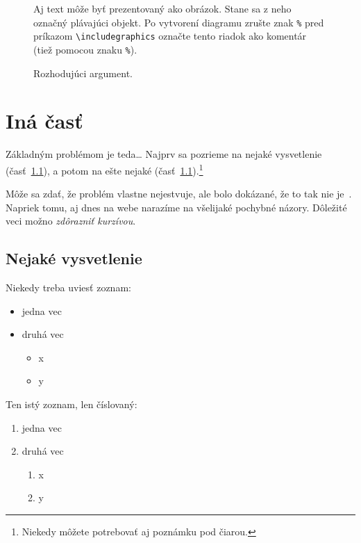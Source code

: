 \documentclass[10pt,twoside,slovak,a4paper]{article}
\begin{document}
\begin{figure*}[tbh]
\centering
Aj text môže byť prezentovaný ako obrázok. Stane sa z neho označný plávajúci objekt. Po vytvorení diagramu zrušte znak \texttt{\%} pred príkazom \verb|\includegraphics| označte tento riadok ako komentár (tiež pomocou znaku \texttt{\%}).
\caption{Rozhodujúci argument.}
\label{f:rozhod}
\end{figure*}



\section{Iná časť} \label{ina}

Základným problémom je teda\ldots{} Najprv sa pozrieme na nejaké vysvetlenie (časť~\ref{ina:nejake}), a potom na ešte nejaké (časť~\ref{ina:nejake}).\footnote{Niekedy môžete potrebovať aj poznámku pod čiarou.}

Môže sa zdať, že problém vlastne nejestvuje\cite{Coplien:MPD}, ale bolo dokázané, že to tak nie je~\cite{Czarnecki:Staged, Czarnecki:Progress}. Napriek tomu, aj dnes na webe narazíme na všelijaké pochybné názory\cite{PLP-Framework}. Dôležité veci možno \emph{zdôrazniť kurzívou}.


\subsection{Nejaké vysvetlenie} \label{ina:nejake}

Niekedy treba uviesť zoznam:

\begin{itemize}
\item jedna vec
\item druhá vec
	\begin{itemize}
	\item x
	\item y
	\end{itemize}
\end{itemize}

Ten istý zoznam, len číslovaný:

\begin{enumerate}
\item jedna vec
\item druhá vec
	\begin{enumerate}
	\item x
	\item y
	\end{enumerate}
\end{enumerate}
\end{document}
